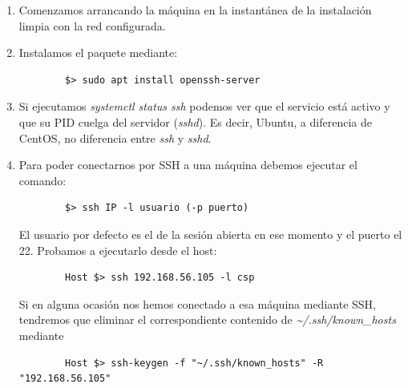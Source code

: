 \documentclass[12pt,spanish]{article}
\begin{document}
\begin{enumerate}
	\item Comenzamos arrancando la máquina en la instantánea de la instalación limpia con la red configurada.
	\item Instalamos el paquete mediante:
	\begin{lstlisting}
		$> sudo apt install openssh-server
	\end{lstlisting}
	\item Si ejecutamos \textit{systemctl status ssh} podemos ver que el servicio está activo y que su PID cuelga del servidor (\textit{sshd}). Es decir, Ubuntu, a diferencia de CentOS, no diferencia entre \textit{ssh} y \textit{sshd}.
	\item Para poder conectarnos por SSH a una máquina debemos ejecutar el comando:
	\begin{lstlisting}
		$> ssh IP -l usuario (-p puerto)
	\end{lstlisting}
	El usuario por defecto es el de la sesión abierta en ese momento y el puerto el 22.
	Probamos a ejecutarlo desde el host:
	\begin{lstlisting}
		Host $> ssh 192.168.56.105 -l csp
	\end{lstlisting}
	Si en alguna ocasión nos hemos conectado a esa máquina mediante SSH, tendremos que eliminar el correspondiente contenido de \textit{\~{}/.ssh/known\_hosts} mediante
	\begin{lstlisting}
		Host $> ssh-keygen -f "~/.ssh/known_hosts" -R "192.168.56.105"
	\end{lstlisting}



\end{enumerate}
\end{document}
